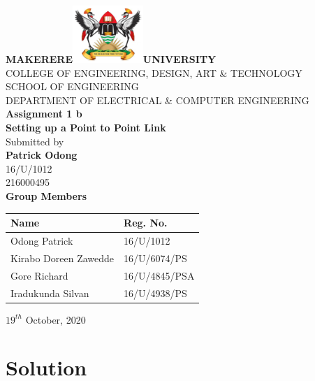 \documentclass[12pt,a4paper,openright]{report}
\begin{document}
		\begin{titlepage}
			
			\begin{center}
				\Huge{\textbf{MAKERERE}}\includegraphics[width=0.2\textwidth]{logo.png}\Huge{\textbf{UNIVERSITY}}\\[0.5in]
				\Large
				COLLEGE OF ENGINEERING, DESIGN, ART \& TECHNOLOGY\\[0.3in]
				SCHOOL OF ENGINEERING\\[0.3in]
				\large{DEPARTMENT OF ELECTRICAL \& COMPUTER ENGINEERING} \\[.5in]
				
				\Large \textbf {Assignment 1 b}\\[.3in]
				\Large \textbf {Setting up a Point to Point Link}\\[.5in]
				
				
				
				\normalsize Submitted by \\[0.2in]
				\textbf{Patrick Odong}\\
				16/U/1012\\
				216000495\\
				
				\vspace{.5in}
				\Large \textbf {Group Members}\\[.1in]
				
				\begin{table}[H]
					\begin{center}
						\begin{tabular}{|l|l|}
							\hline
							Name & Reg. No.\\ \hline
							Odong Patrick & 16/U/1012 \\ \hline
							Kirabo Doreen Zawedde & 16/U/6074/PS \\ \hline
							Gore Richard & 16/U/4845/PSA \\ \hline
							Iradukunda Silvan & 16/U/4938/PS \\ \hline
						\end{tabular}
					\end{center}
				\end{table}
				
				
				\vfill
				\normalsize
				$19^{th}$ October, 2020
				
				
				
			\end{center}
			
		\end{titlepage}
	\noindent \section*{Solution}
	
\end{document}
